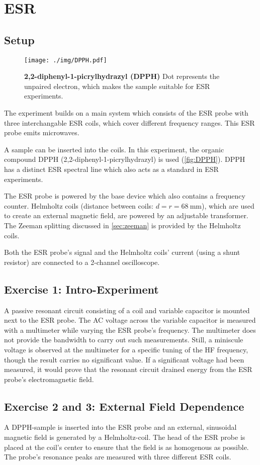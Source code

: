 \chapter{ESR}
\section{Setup}
\begin{figure}
	\centering
	\texttt{[image: ./img/DPPH.pdf]}
	\caption[]{\textbf{2,2-diphenyl-1-picrylhydrazyl (DPPH)} Dot represents the unpaired electron, which makes the sample suitable for ESR experiments.}
	\label{fig:DPPH}
\end{figure}
The experiment builds on a main system which consists of the ESR probe with three interchangable ESR coils, which cover different frequency ranges.
This ESR probe emits microwaves.

A sample can be inserted into the coils.
In this experiment, the organic compound DPPH (2,2-diphenyl-1-picrylhydrazyl) is used (\autoref{fig:DPPH}).
DPPH has a distinct ESR spectral line which also acts as a standard in ESR experiments.

The ESR probe is powered by the base device which also contains a frequency counter.
Helmholtz coils (distance between coils: $d=r=\SI{68}{\mm}$), which are used to create an external magnetic field, are powered by an adjustable transformer.
The Zeeman splitting discussed in \autoref{sec:zeeman} is provided by the Helmholtz coils.

Both the ESR probe's signal and the Helmholtz coils' current (using a shunt resistor) are connected to a 2-channel oscilloscope.

\section{Exercise 1: Intro-Experiment}
A passive resonant circuit consisting of a coil and variable capacitor is mounted next to the ESR probe.
The AC voltage across the variable capacitor is measured with a multimeter while varying the ESR probe's frequency.
The multimeter does not provide the bandwidth to carry out such measurements.
Still, a miniscule voltage is observed at the multimeter for a specific tuning of the HF frequency, though the result carries no significant value.
If a significant voltage had been measured, it would prove that the resonant circuit drained energy from the ESR probe's electromagnetic field.

\section{Exercise 2 and 3: External Field Dependence}
A DPPH-sample is inserted into the ESR probe and an external, sinusoidal magnetic field is generated by a Helmholtz-coil.
The head of the ESR probe is placed at the coil's center to ensure that the field is as homogenous as possible.
The probe's resonance peaks are measured with three different ESR coils.

